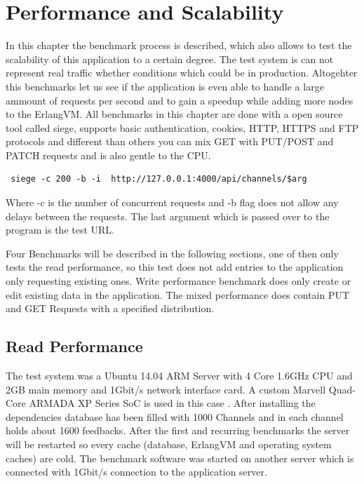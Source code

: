 

\chapter{Performance and Scalability} \label{Performance and Scalability}
\label{perf_scale}
In this chapter the benchmark process is described, which also allows to test the scalability of this application to a certain degree. The test system is can not represent real traffic whether conditions which could be in production. Altogehter this benchmarks let us see if the application is even able to handle a large ammount of requests per second and to gain a speedup while adding more nodes to the ErlangVM.
All benchmarks in this chapter are done with a open source tool called siege, supports basic authentication, cookies, HTTP, HTTPS and FTP protocols and different than others you can mix GET with PUT/POST and PATCH requests and is also gentle to the CPU.
\begin{verbatim} siege -c 200 -b -i  http://127.0.0.1:4000/api/channels/$arg
\end{verbatim} Where -c is the number of concurrent requests and -b flag does not allow any delays between the requests. The last argument which is passed over to the program is the test URL.

Four Benchmarks will be described in the following sections, one of then only tests the read performance, so this test does not add entries to the application only requesting existing ones. Write performance benchmark does only create or edit existing data in the application.
The mixed performance does contain PUT and GET Requests with a specified distribution.

\section{Read Performance}
The test system was a Ubuntu 14.04 ARM Server with 4 Core 1.6GHz CPU and 2GB main memory and 1Gbit/s network interface card.  A custom Marvell Quad-Core ARMADA XP Series SoC is used in this case \cite{MarArm}.  After installing the dependencies database has been filled with 1000 Channels and in each channel holds about 1600 feedbacks. After the first and recurring benchmarks the server will be restarted so every cache (database, ErlangVM and operating system caches) are cold. The benchmark software was started on another server which is connected with 1Gbit/s connection to the application server.

